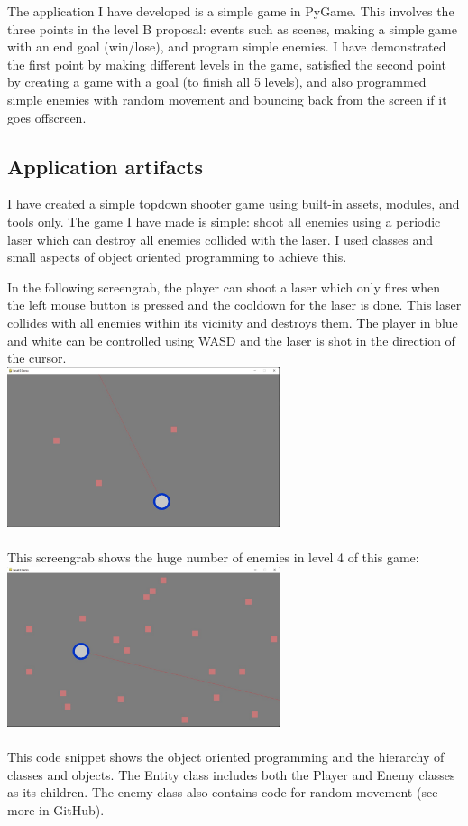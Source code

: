 \documentclass[a4paper, 11pt]{report}
\begin{document}
The application I have developed is a simple game in PyGame. This involves the three points in the level B proposal: events such as scenes, making a simple game with an end goal (win/lose), and program simple enemies. I have demonstrated the first point by making different levels in the game, satisfied the second point by creating a game with a goal (to finish all 5 levels), and also programmed simple enemies with random movement and bouncing back from the screen if it goes offscreen.

\subsection{Application artifacts}

I have created a simple topdown shooter game using built-in assets, modules, and tools only. The game I have made is simple: shoot all enemies using a periodic laser which can destroy all enemies collided with the laser. I used classes and small aspects of object oriented programming to achieve this.

In the following screengrab, the player can shoot a laser which only fires when the left mouse button is pressed and the cooldown for the laser is done. This laser collides with all enemies within its vicinity and destroys them. The player in blue and white can be controlled using WASD and the laser is shot in the direction of the cursor.
\\
\includegraphics[width=8cm]{Level B Demo}\\[1cm]
\\

This screengrab shows the huge number of enemies in level 4 of this game:
\\
\includegraphics[width=8cm]{Level B Demo2}\\[1cm]
\\
This code snippet shows the object oriented programming and the hierarchy of classes and objects. The Entity class includes both the Player and Enemy classes as its children. The enemy class also contains code for random movement (see more in GitHub).
\end{document}
